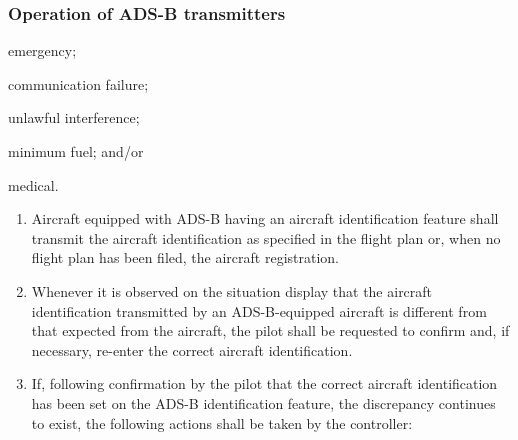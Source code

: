 \subsubsection{Operation of ADS-B transmitters}

\begin{noteev}
     \label{8.5.4N1}
    \begin{enumalph}
        \item emergency;
        \item communication failure;
        \item unlawful interference;
        \item minimum fuel; and/or
        \item medical.
    \end{enumalph}
\end{noteev}

\begin{enumerate}
    \item Aircraft equipped with ADS-B having an aircraft identification feature shall transmit the aircraft identification as specified in the flight plan or, when no flight plan has been filed, the aircraft registration.
    \item Whenever it is observed on the situation display that the aircraft identification transmitted by an ADS-B-equipped aircraft is different from that expected from the aircraft, the pilot shall be requested to confirm and, if necessary, re-enter the correct aircraft identification.
    \item If, following confirmation by the pilot that the correct aircraft identification has been set on the ADS-B identification feature, the discrepancy continues to exist, the following actions shall be taken by the controller:

\end{enumerate}

